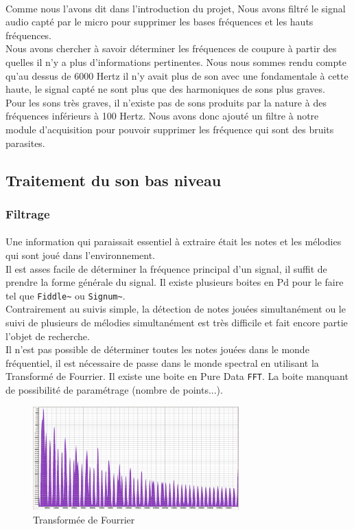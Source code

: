 \documentclass[a4paper, titlepage, oneside, 12pt]{article}%
\begin{document}
\paragraph{}
Comme nous l'avons dit dans l'introduction du projet, Nous avons filtré le signal audio capté par le micro pour supprimer les bases fréquences et les hauts fréquences.\\
Nous avons chercher à savoir déterminer les fréquences de coupure à partir des quelles il n'y a plus d'informations pertinentes. Nous nous sommes rendu compte qu'au dessus de 6000 Hertz il n'y avait plus de son avec une fondamentale à cette haute, le signal capté ne sont plus que des harmoniques de sons plus graves.\\
Pour les sons très graves, il n'existe pas de sons produits par la nature à des fréquences inférieurs à 100 Hertz. Nous avons donc ajouté un filtre à notre module d'acquisition pour pouvoir supprimer les fréquence qui sont des bruits parasites.

\subsection{Traitement du son bas niveau}
\subsubsection{Filtrage}
\paragraph{}
Une information qui paraissait essentiel à extraire était les notes et les mélodies qui sont joué dans l’environnement.\\
Il est asses facile de déterminer la fréquence principal d'un signal, il suffit de prendre la forme générale du signal. Il existe plusieurs boites en Pd pour le faire tel que \texttt{Fiddle\~} ou \texttt{Signum\~}.\\
Contrairement au suivis simple, la détection de notes jouées simultanément ou le suivi de  plusieurs de mélodies simultanément est très difficile et fait encore partie l'objet de recherche.\\
Il n'est pas possible de déterminer toutes les notes jouées dans le monde fréquentiel, il est nécessaire de passe dans le monde spectral en utilisant la Transformé de Fourrier. Il existe une boite en Pure Data \texttt{FFT}. La boite manquant de possibilité de paramétrage (nombre de points...).
\begin{figure}[H]
	\centering
	\includegraphics[width=300px]{fft.jpg}
	\caption{Transformée de Fourrier}
\end{figure}
\end{document}
